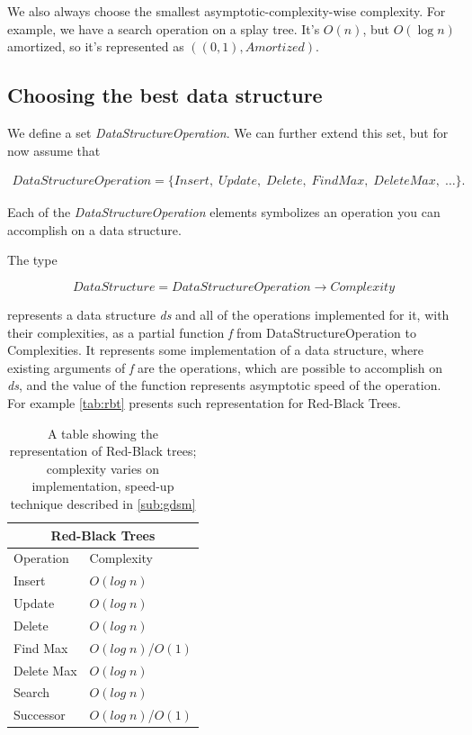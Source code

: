 \documentclass[a4paper,11pt]{article}
\begin{document}
		We also always choose the smallest asymptotic-complexity-wise complexity.  For example, we have a search
		operation on a splay tree. It's $O(n)$, but $O(\log n)$ amortized, so it's represented as
		$((0,1),Amortized)$.

	\subsection{Choosing the best data structure} \label{sec:choose-ds}

		We define a set \emph{DataStructureOperation}. We can further extend this set, but for now assume that

		\begin{eqnarray}
			\mathit{DataStructureOperation} = \{Insert, \; Update, \; Delete, \; FindMax,\; DeleteMax, \; \dots\}.
		\end{eqnarray}

		Each of the \emph{DataStructureOperation} elements symbolizes an operation you can accomplish on a data
		structure.

		The type

		\begin{equation}\label{data-structure-type}
			DataStructure = DataStructureOperation \rightarrow Complexity
		\end{equation}

		represents a data structure \emph{ds} and all of the operations implemented for it, with their complexities, as a
		partial function \emph{f} from DataStructureOperation to Complexities. It represents some implementation of a
		data structure, where existing arguments of \emph{f} are the operations, which are possible to accomplish on
		\emph{ds}, and the value of the function represents asymptotic speed of the operation. For example
		\autoref{tab:rbt} presents such representation for Red-Black Trees.

		\begin{table}[h!]
			\centering
			\begin{tabular}{|l|l|}
				\hline
				\multicolumn{2}{|c|}{Red-Black Trees} \\
				\hline
				Operation & Complexity \\
				\hline
				Insert 	        & $O(log \; n)$ \\
				Update          & $O(log \; n)$ \\
				Delete	        & $O(log \; n)$ \\
				Find Max 	& $O(log \; n)$/$O(1)$\\
				Delete Max	& $O(log \; n)$ \\
				Search 		& $O(log \; n)$ \\
				Successor 	& $O(log \; n)$/$O(1)$\\
				\hline
			\end{tabular}
			\caption{A table showing the representation of Red-Black trees; complexity varies on
			implementation, speed-up technique described in \autoref{sub:gdsm}}
			\label{tab:rbt}
		\end{table}
\end{document}
